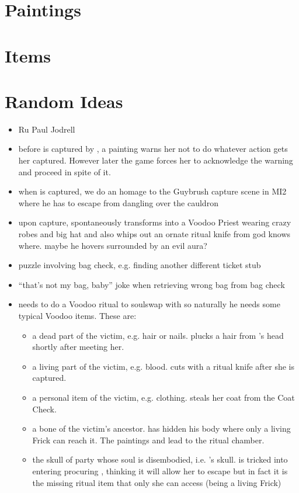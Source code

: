\documentclass{article}
\begin{document}
\section{Paintings}
\section{Items}
\section{Random Ideas}
\begin{itemize}
  \item Ru Paul Jodrell
  \item before \cyl{} is captured by \cfrick{}, a painting warns her not to do whatever action gets her captured. However later the game forces her to acknowledge the warning and proceed in spite of it.
  \item when \cyl{} is captured, we do an homage to the Guybrush capture scene in MI2 where he has to escape from dangling over the cauldron
  \item upon capture, \iaudioguide{} spontaneously transforms into a Voodoo Priest wearing crazy robes and big hat and also whips out an ornate ritual knife from god knows where. maybe he hovers surrounded by an evil aura?
  \item puzzle involving bag check, e.g. finding another different ticket stub
  \item ``that's not my bag, baby'' joke when retrieving wrong bag from bag check
  \item \cfrick{} needs to do a Voodoo ritual to soulswap with \cyl{} so naturally he needs some typical Voodoo items. These are:
    \begin{itemize}
      \item a dead part of the victim, e.g. hair or nails. \ccurator{} plucks a hair from \cyl{}'s head shortly after meeting her.
      \item a living part of the victim, e.g. blood. \iaudioguide{} cuts \cyl{} with a ritual knife after she is captured.
      \item a personal item of the victim, e.g. clothing. \ccurator{} steals her coat from the Coat Check.
      \item a bone of the victim's ancestor. \cfrick{} has hidden his body where only a living Frick can reach it. The paintings and \iaudioguide{} lead \cyl{} to the ritual chamber.
      \item the skull of party whose soul is disembodied, i.e. \cfrick{}'s skull. \cyl{} is tricked into entering procuring \ifrickskull{}, thinking it will allow her to escape but in fact it is the missing ritual item that only she can access (being a living Frick)

\end{itemize}
\end{itemize}
\end{document}
